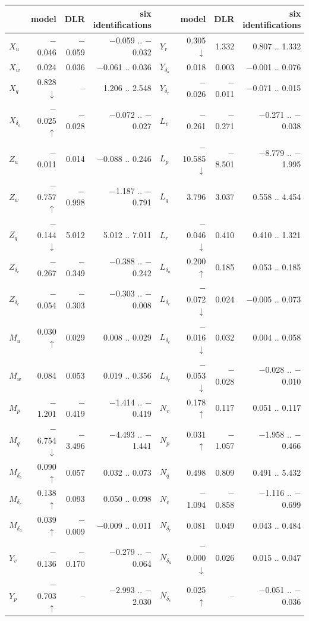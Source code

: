 \begin{tabular}{@{}lrrr@{\hspace{8mm}}lrrr@{}}
\toprule
& model & DLR & six identifications & & model & DLR & six identifications \\
\midrule
$X_{u}$ & $-$0.046 & $-$0.059 & $-$0.059 .. $-$0.032 & $Y_{r}$ & 0.305$\downarrow$ & 1.332 & 0.807 .. 1.332 \\
$X_{w}$ & 0.024 & 0.036 & $-$0.061 .. 0.036 & $Y_{\delta_a}$ & 0.018 & 0.003 & $-$0.001 .. 0.076 \\
$X_{q}$ & 0.828$\downarrow$ & -- & 1.206 .. 2.548 & $Y_{\delta_r}$ & $-$0.026 & $-$0.011 & $-$0.071 .. 0.015 \\
$X_{\delta_e}$ & $-$0.025$\uparrow$ & $-$0.028 & $-$0.072 .. $-$0.027 & $L_{v}$ & $-$0.261 & $-$0.271 & $-$0.271 .. $-$0.038 \\
$Z_{u}$ & $-$0.011 & 0.014 & $-$0.088 .. 0.246 & $L_{p}$ & $-$10.585$\downarrow$ & $-$8.501 & $-$8.779 .. $-$1.995 \\
$Z_{w}$ & $-$0.757$\uparrow$ & $-$0.998 & $-$1.187 .. $-$0.791 & $L_{q}$ & 3.796 & 3.037 & 0.558 .. 4.454 \\
$Z_{q}$ & $-$0.144$\downarrow$ & 5.012 & 5.012 .. 7.011 & $L_{r}$ & $-$0.046$\downarrow$ & 0.410 & 0.410 .. 1.321 \\
$Z_{\delta_c}$ & $-$0.267 & $-$0.349 & $-$0.388 .. $-$0.242 & $L_{\delta_a}$ & 0.200$\uparrow$ & 0.185 & 0.053 .. 0.185 \\
$Z_{\delta_e}$ & $-$0.054 & $-$0.303 & $-$0.303 .. $-$0.008 & $L_{\delta_e}$ & $-$0.072$\downarrow$ & 0.024 & $-$0.005 .. 0.073 \\
$M_{u}$ & 0.030$\uparrow$ & 0.029 & 0.008 .. 0.029 & $L_{\delta_c}$ & $-$0.016$\downarrow$ & 0.032 & 0.004 .. 0.058 \\
$M_{w}$ & 0.084 & 0.053 & 0.019 .. 0.356 & $L_{\delta_r}$ & $-$0.053$\downarrow$ & $-$0.028 & $-$0.028 .. $-$0.010 \\
$M_{p}$ & $-$1.201 & $-$0.419 & $-$1.414 .. $-$0.419 & $N_{v}$ & 0.178$\uparrow$ & 0.117 & 0.051 .. 0.117 \\
$M_{q}$ & $-$6.754$\downarrow$ & $-$3.496 & $-$4.493 .. $-$1.441 & $N_{p}$ & 0.031$\uparrow$ & $-$1.057 & $-$1.958 .. $-$0.466 \\
$M_{\delta_c}$ & 0.090$\uparrow$ & 0.057 & 0.032 .. 0.073 & $N_{q}$ & 0.498 & 0.809 & 0.491 .. 5.432 \\
$M_{\delta_e}$ & 0.138$\uparrow$ & 0.093 & 0.050 .. 0.098 & $N_{r}$ & $-$1.094 & $-$0.858 & $-$1.116 .. $-$0.699 \\
$M_{\delta_a}$ & 0.039$\uparrow$ & $-$0.009 & $-$0.009 .. 0.011 & $N_{\delta_r}$ & 0.081 & 0.049 & 0.043 .. 0.484 \\
$Y_{v}$ & $-$0.136 & $-$0.170 & $-$0.279 .. $-$0.064 & $N_{\delta_a}$ & $-$0.000$\downarrow$ & 0.026 & 0.015 .. 0.047 \\
$Y_{p}$ & $-$0.703$\uparrow$ & -- & $-$2.993 .. $-$2.030 & $N_{\delta_c}$ & 0.025$\uparrow$ & -- & $-$0.051 .. $-$0.036 \\
\bottomrule
\end{tabular}

